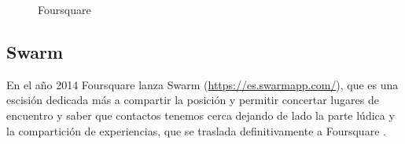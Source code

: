 \begin{figure}[h!btp]
	\begin{adjustbox}{minipage=\linewidth, fbox}
		\centering
		\hspace{10mm}
	\end{adjustbox}
\caption{Foursquare}
	\label{fig:foursquare}
\end{figure}

\subsection{Swarm}
En el año 2014 Foursquare lanza Swarm (\url{https://es.swarmapp.com/}), que es una escisión dedicada más a compartir la posición y permitir concertar lugares de encuentro y saber que contactos tenemos cerca dejando de lado la parte lúdica y la compartición de experiencias, que se traslada definitivamente a Foursquare \cite{Buzz14}.


